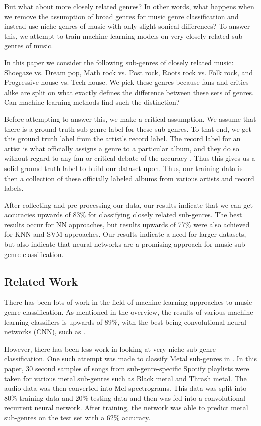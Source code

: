 \documentclass[letterpaper, 12 pt, conference]{ieeeconf}  %
\begin{document}
But what about more closely related genres? In other words, what happens when we remove the assumption of broad genres for music genre classification and instead use niche genres of music with only slight sonical differences?  To answer this, we attempt to train machine learning models on very closely related sub-genres of music. 

In this paper we consider the following sub-genres of closely related music: Shoegaze vs. Dream pop, Math rock vs. Post rock, Roots rock vs. Folk rock, and Progressive house vs. Tech house. We pick these genres because fans and critics alike are split on what exactly defines the difference between these sets of genres. Can machine learning methods find such the distinction? 

Before attempting to answer this, we make a critical assumption. We assume that there is a ground truth sub-genre label for these sub-genres. To that end, we get this ground truth label from the artist's record label. The record label for an artist is what officially assigns a genre to a particular album, and they do so without regard to any fan or critical debate of the accuracy \cite{c8}. Thus this gives us a solid ground truth label to build our dataset upon. Thus, our training data is then a collection of these officially labeled albums from various artists and record labels.

After collecting and pre-processing our data, our results indicate that we can get accuracies upwards of 83\%  for classifying closely related sub-genres. The best results occur for NN approaches, but results upwards of 77\% were also achieved for KNN and SVM approaches. Our results indicate a need for larger datasets, but also indicate that neural networks are a promising approach for music sub-genre classification. 




\subsection{Related Work}


There has been lots of work in the field of machine learning approaches to music genre classification. As mentioned in the overview, the results of various machine learning classifiers is upwards of 89\%, with the best being convolutional neural networks (CNN),  such as \cite{c4}. 

However, there has been less work in looking at very niche sub-genre classification. One such attempt was made to classify Metal sub-genres in \cite{c5}. In this paper, 30 second samples of songs from sub-genre-specific Spotify playlists were taken for various metal sub-genres such as Black metal and Thrash metal. The audio data was then converted into Mel spectrograms. This data was split into 80\% training data and 20\% testing data and then was fed into a convolutional recurrent neural network. After training, the network was able to predict metal sub-genres on the test set with a 62\% accuracy. 
\end{document}
